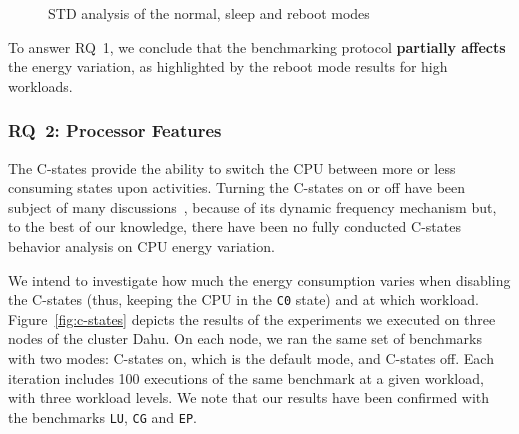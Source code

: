 \begin{figure}
    \caption{STD analysis of the \textsf{normal}, \textsf{sleep} and \textsf{reboot} modes}\label{fig:reboot}
\end{figure}

\begin{mdframed}[skipabove=\topsep,skipbelow=\topsep]

    To answer \textsc{RQ~1}, we conclude that the benchmarking protocol \textbf{partially affects} the energy variation, as highlighted by the \textsf{reboot} mode results for high workloads.

\end{mdframed}


\subsubsection{\textsc{RQ}~2: Processor Features}
The C-states provide the ability to switch the CPU between more or less consuming states upon activities.
Turning the C-states on or off have been subject of many discussions~\cite{5463056}, because of its dynamic frequency mechanism but, to the best of our knowledge, there have been no fully conducted C-states behavior analysis on CPU energy variation.

We intend to investigate how much the energy consumption varies when disabling the C-states (thus, keeping the CPU in the \texttt{C0} state) and at which workload.
Figure~\ref{fig:c-states} depicts the results of the experiments we executed on three nodes of the cluster \textsf{Dahu}.
On each node, we ran the same set of benchmarks with two modes: \textsf{C-states on}, which is the default mode, and \textsf{C-states off}.
Each iteration includes 100 executions of the same benchmark at a given workload, with three workload levels.
We note that our results have been confirmed with the benchmarks \texttt{LU}, \texttt{CG} and \texttt{EP}.

